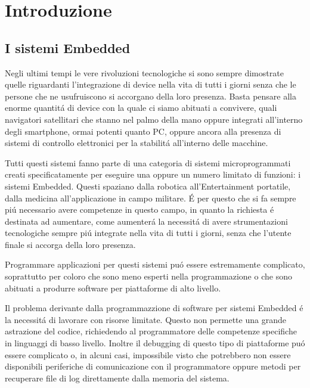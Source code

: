 \chapter{Introduzione}
\section{I sistemi Embedded}
Negli ultimi tempi le vere rivoluzioni tecnologiche si sono sempre
dimostrate quelle riguardanti l'integrazione di device nella vita di tutti
i giorni senza che le persone che ne usufruiscono si accorgano della loro
presenza. Basta pensare alla enorme quantit\'a di device con la quale ci
siamo abituati a convivere, quali navigatori satellitari che stanno nel
palmo della mano oppure integrati all'interno degli smartphone, ormai
potenti quanto PC, oppure ancora alla presenza di sistemi di controllo
elettronici per la stabilit\'a all'interno delle macchine.

Tutti questi sistemi fanno parte di una categoria di sistemi
microprogrammati creati specificatamente per eseguire una oppure un numero
limitato di funzioni: i sistemi Embedded. Questi spaziano dalla robotica
all'Entertainment portatile, dalla medicina all'applicazione in campo
militare. \'E per questo che si fa sempre pi\'u necessario avere competenze
in questo campo, in quanto la richiesta \'e destinata ad aumentare,
come aumenter\'a la necessit\'a di avere strumentazioni tecnologiche sempre
pi\'u integrate nella vita di tutti i giorni, senza che l'utente finale si
accorga della loro presenza.

Programmare applicazioni per questi sistemi pu\'o essere
estremamente complicato, soprattutto per coloro che sono meno esperti nella
programmazione o che sono abituati a produrre software per piattaforme di
alto livello.

 Il problema derivante dalla programmazzione di software per
sistemi Embedded \'e la necessit\'a di lavorare con risorse limitate.
Questo non permette una grande astrazione del codice, richiedendo al
programmatore delle competenze specifiche in linguaggi di basso livello.
Inoltre il debugging di questo tipo di piattaforme pu\'o essere complicato
o, in alcuni casi, impossibile visto che potrebbero non essere disponibili
periferiche di comunicazione con il programmatore oppure metodi per
recuperare file di log direttamente dalla memoria del sistema.

